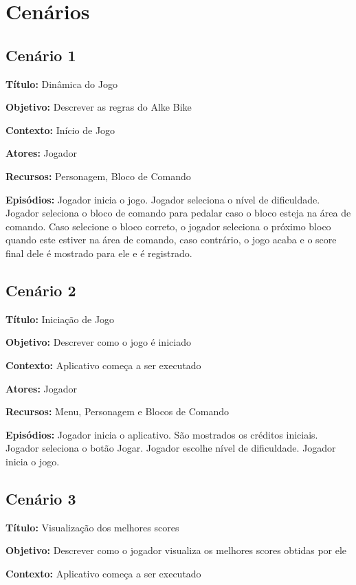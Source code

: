 \section{Cenários}
\subsection{Cenário 1}

\textbf{Título:} Dinâmica do Jogo 

\textbf{Objetivo:} Descrever as regras do Alke Bike 

\textbf{Contexto:} Início de Jogo

\textbf{Atores:} Jogador

\textbf{Recursos:} Personagem, Bloco de Comando

\textbf{Episódios:} Jogador inicia o jogo. Jogador seleciona o nível de dificuldade. Jogador seleciona o bloco de comando para pedalar caso o bloco esteja na área de comando. Caso selecione o bloco correto, o jogador seleciona o próximo bloco quando este estiver na área de comando, caso contrário, o jogo acaba e o score final dele é mostrado para ele e é registrado.

\subsection{Cenário 2}

\textbf{Título:} Iniciação de Jogo

\textbf{Objetivo:} Descrever como o jogo é iniciado 

\textbf{Contexto:} Aplicativo começa a ser executado 

\textbf{Atores:} Jogador

\textbf{Recursos:} Menu, Personagem e Blocos de Comando

\textbf{Episódios:} Jogador inicia o aplicativo. São mostrados os créditos iniciais. Jogador seleciona o botão Jogar. Jogador escolhe nível de dificuldade. Jogador inicia o jogo.

\subsection{Cenário 3}

\textbf{Título:} Visualização dos melhores scores

\textbf{Objetivo:} Descrever como o jogador visualiza os melhores scores obtidas por ele

\textbf{Contexto:} Aplicativo começa a ser executado

